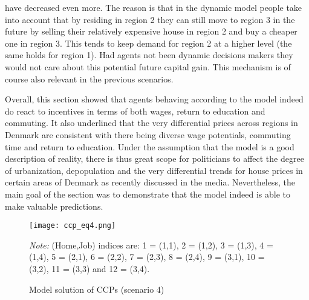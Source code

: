 have decreased even more. The reason is that in the dynamic model people take into account that by residing in region 2 they can still move to region 3 in the future by selling their relatively expensive house in region 2 and buy a cheaper one in region 3. This tends to keep demand for region 2 at a higher level (the same holds for region 1). Had agents not been dynamic decisions makers they would not care about this potential future capital gain. This mechanism is of course also relevant in the previous scenarios. 

Overall, this section showed that agents behaving according to the model indeed do react to incentives in terms of both wages, return to education and commuting. It also underlined that the very differential prices across regions in Denmark are consistent with there being diverse wage potentials, commuting time and return to education. Under the assumption that the model is a good description of reality, there is thus great scope for politicians to affect the degree of urbanization, depopulation and the very differential trends for house prices in certain areas of Denmark as recently discussed in the media. Nevertheless, the main goal of the section was to demonstrate that the model indeed is able to make valuable predictions.

\begin{figure}
\centering
\begin{minipage}{0.7\textwidth}
\texttt{[image: ccp\_eq4.png]} 
{\footnotesize \emph{Note:} (Home,Job) indices are: 1 = (1,1), 2 = (1,2), 3 = (1,3), 4 = (1,4), 5 = (2,1), 6 = (2,2), 7 = (2,3), 8 = (2,4), 9 = (3,1), 10 = (3,2), 11 = (3,3) and 12 = (3,4). \par}
\end{minipage}
\caption{Model solution of CCPs (scenario 4)}
\label{fig:sce4}
\end{figure}